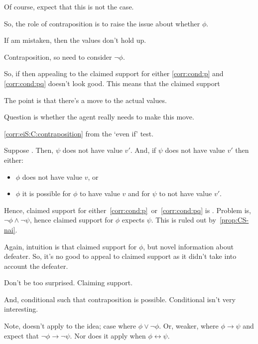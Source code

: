 \begin{note}
  Of course, expect that this is not the case.


  So, the role of contraposition is to raise the issue about whether \(\phi\).

  If am mistaken, then the values don't hold up.

  Contraposition, so need to consider \(\lnot\phi\).




  So, if \misled{} then appealing to the claimed support for either \ref{corr:cond:p} and \ref{corr:cond:pq} doesn't look good.
  This means that the claimed support



  The point is that there's a move to the actual values.

  Question is whether the agent really needs to make this move.





  \autoref{corr:eiS:C:contraposition} from the `even if' test.




  Suppose \misled{}.
  Then, \(\psi\) does not have value \(v'\).
  And, if \(\psi\) does not have value \(v'\) then either:
  \begin{itemize}
  \item \(\phi\) does not have value \(v\), or
  \item \(\phi\) it is possible for \(\phi\) to have value \(v\) and for \(\psi\) to not have value \(v'\).
  \end{itemize}

  Hence, claimed support for either~\ref{corr:cond:p}~or~\ref{corr:cond:pq} is \mistaken{}.
  Problem is, \(\lnot\phi \land \lnot\psi\), hence claimed support for \(\phi\) expects \(\psi\).
  This is ruled out by~\autoref{prop:CS-nai}.

  Again, intuition is that claimed support for \(\phi\), but novel information about defeater.
  So, it's no good to appeal to claimed support as it didn't take into account the defeater.

  Don't be too surprised.
  Claiming support.

  And, conditional such that contraposition is possible.
  Conditional isn't very interesting.

  Note, doesn't apply to the idea; case where \(\phi \lor \lnot\phi\).
  Or, weaker, where \(\phi \rightarrow \psi\) and expect that \(\lnot \phi \rightarrow \lnot \psi\).
  Nor does it apply when \(\phi \leftrightarrow \psi\).


\end{note}
